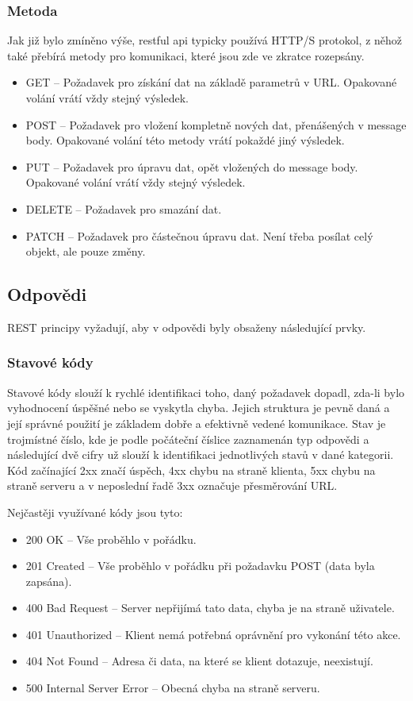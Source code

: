 \subsubsection*{Metoda}
Jak již bylo zmíněno výše, \gls{restful api} typicky používá HTTP/S protokol, z něhož také přebírá metody pro komunikaci, které jsou zde ve zkratce rozepsány.

\begin{itemize}
    \item GET -- Požadavek pro získání dat na základě parametrů v URL. Opakované volání vrátí vždy stejný výsledek.
    \item POST -- Požadavek pro vložení kompletně nových dat, přenášených v message body. Opakované volání této metody vrátí pokaždé jiný výsledek.
    \item PUT -- Požadavek pro úpravu dat, opět vložených do message body. Opakované volání vrátí vždy stejný výsledek.
    \item DELETE -- Požadavek pro smazání dat.
    \item PATCH -- Požadavek pro částečnou úpravu dat. Není třeba posílat celý objekt, ale pouze změny.
\end{itemize}


\subsection{Odpovědi}
REST principy vyžadují, aby v odpovědi byly obsaženy následující prvky.

\subsubsection*{Stavové kódy}
Stavové kódy slouží k rychlé identifikaci toho, daný požadavek dopadl, zda-li bylo vyhodnocení úspěšné nebo se vyskytla chyba. Jejich struktura je pevně daná a její správné použití je základem dobře a efektivně vedené komunikace. Stav je trojmístné číslo, kde je podle počáteční číslice zaznamenán typ odpovědi a následující dvě cifry už slouží k identifikaci jednotlivých stavů v dané kategorii. Kód začínající 2xx značí úspěch, 4xx chybu na straně klienta, 5xx chybu na straně serveru a v neposlední řadě 3xx označuje přesměrování URL.

Nejčastěji využívané kódy jsou tyto:

\begin{itemize}
    \item 200 OK -- Vše proběhlo v pořádku.
    \item 201 Created -- Vše proběhlo v pořádku při požadavku POST (data byla zapsána).
    \item 400 Bad Request -- Server nepřijímá tato data, chyba je na straně uživatele.
    \item 401 Unauthorized -- Klient nemá potřebná oprávnění pro vykonání této akce.
    \item 404 Not Found -- Adresa či data, na které se klient dotazuje, neexistují.
    \item 500 Internal Server Error -- Obecná chyba na straně serveru.
\end{itemize}


